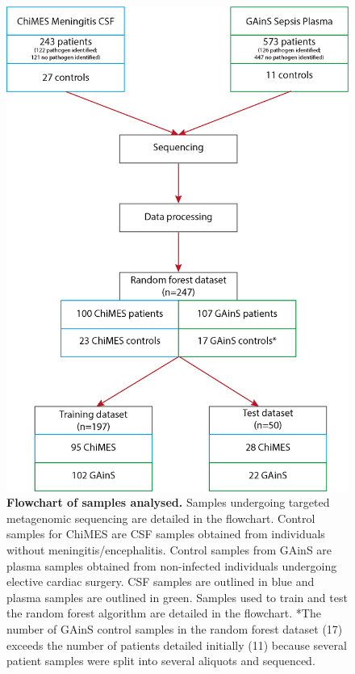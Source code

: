 \FloatBarrier
\begin{figure}[htbp]
\centering
\includegraphics[scale=0.8]{./Results2/Images/flowchart.png}
\caption[Flowchart of samples analysed]{\textbf{Flowchart of samples analysed.} Samples undergoing targeted metagenomic sequencing are detailed in the flowchart. Control samples for ChiMES are CSF samples obtained from individuals without meningitis/encephalitis. Control samples from GAinS are plasma samples obtained from non-infected individuals undergoing elective cardiac surgery. CSF samples are outlined in blue and plasma samples are outlined in green. Samples used to train and test the random forest algorithm are detailed in the flowchart. *The number of GAinS control samples in the random forest dataset (17) exceeds the number of patients detailed initially (11) because several patient samples were split into several aliquots and sequenced.}
\label{fig:samples}
\end{figure}

